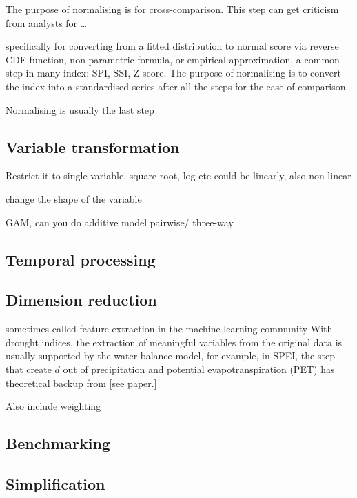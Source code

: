 \documentclass[
]{article}
\begin{document}
The purpose of normalising is for cross-comparison. This step can get
criticism from analysts for \ldots{}

specifically for converting from a fitted distribution to normal score
via reverse CDF function, non-parametric formula, or empirical
approximation, a common step in many index: SPI, SSI, Z score. The
purpose of normalising is to convert the index into a standardised
series after all the steps for the ease of comparison.

Normalising is usually the last step

\hypertarget{variable-transformation}{%
\subsection{Variable transformation}\label{variable-transformation}}

Restrict it to single variable, square root, log etc could be linearly,
also non-linear

change the shape of the variable

GAM, can you do additive model pairwise/ three-way

\hypertarget{temporal-processing}{%
\subsection{Temporal processing}\label{temporal-processing}}

\hypertarget{dimension-reduction}{%
\subsection{Dimension reduction}\label{dimension-reduction}}

sometimes called feature extraction in the machine learning community
With drought indices, the extraction of meaningful variables from the
original data is usually supported by the water balance model, for
example, in SPEI, the step that create \(d\) out of precipitation and
potential evapotranspiration (PET) has theoretical backup from {[}see
paper.{]}

Also include weighting

\hypertarget{benchmarking}{%
\subsection{Benchmarking}\label{benchmarking}}

\hypertarget{simplification}{%
\subsection{Simplification}\label{simplification}}
\end{document}
